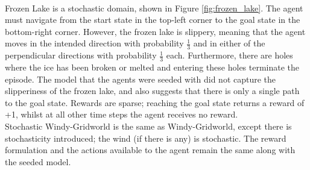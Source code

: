 \\Frozen Lake \cite{1606.01540} is a stochastic domain, shown in Figure \ref{fig:frozen_lake}. The agent must navigate from the start state in the top-left corner to the goal state in the bottom-right corner. However, the frozen lake is slippery, meaning that the agent moves in the intended direction with probability $\frac{1}{3}$ and in either of the perpendicular directions with probability $\frac{1}{3}$ each. Furthermore, there are holes where the ice has been broken or melted and entering these holes terminate the episode. The model that the agents were seeded with did not capture the slipperiness of the frozen lake, and also suggests that there is only a single path to the goal state. Rewards are sparse; reaching the goal state returns a reward of +1, whilst at all other time steps the agent receives no reward.
\\Stochastic Windy-Gridworld is the same as Windy-Gridworld, except there is stochasticity introduced;  the wind (if there is any) is stochastic. The reward formulation and the actions available to the agent remain the same along with the seeded model.

